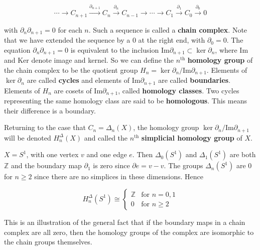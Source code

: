 $$\cdots \to C_{n+1} \xrightarrow{\partial_{n+1}} C_n \xrightarrow{\partial_n} C_{n-1} \to \cdots \to C_1 \xrightarrow{\partial_1} C_0 \xrightarrow{\partial_0} 0$$

with $\partial_n\partial_{n+1} = 0$ for each $n$. Such a sequence is called a \textbf{chain complex}. Note that
we have extended the sequence by a 0 at the right end, with $\partial_0 = 0$. The equation
$\partial_n\partial_{n+1} = 0$ is equivalent to the inclusion $\text{Im}\partial_{n+1} \subset \ker\partial_n$, where Im and Ker denote
image and kernel. So we can define the $n^{\text{th}}$ \textbf{homology group} of the chain complex to
be the quotient group $H_n = \ker\partial_n / \text{Im}\partial_{n+1}$. Elements of $\ker\partial_n$ are called \textbf{cycles} and
elements of $\text{Im}\partial_{n+1}$ are called \textbf{boundaries}. Elements of $H_n$ are cosets of $\text{Im}\partial_{n+1}$,
called \textbf{homology classes}. Two cycles representing the same homology class are said
to be \textbf{homologous}. This means their difference is a boundary.

Returning to the case that $C_n = \Delta_n(X)$, the homology group $\ker\partial_n / \text{Im}\partial_{n+1}$ will
be denoted $H^\Delta_n(X)$ and called the $n^{\text{th}}$ \textbf{simplicial homology group} of $X$.

\begin{example}
\label{ex:simplicial-homology-circle}
$X = S^1$, with one vertex $v$ and one edge $e$. Then $\Delta_0(S^1)$
and $\Delta_1(S^1)$ are both $\mathbb{Z}$ and the boundary map $\partial_1$ is zero since $\partial e = v - v$.
The groups $\Delta_n(S^1)$ are 0 for $n \geq 2$ since there are no simplices in these
dimensions. Hence
\end{example}

$$H^\Delta_n(S^1) \cong \begin{cases} \mathbb{Z} & \text{for } n = 0, 1 \\ 0 & \text{for } n \geq 2 \end{cases}$$

This is an illustration of the general fact that if the boundary maps in a chain complex
are all zero, then the homology groups of the complex are isomorphic to the chain
groups themselves.

